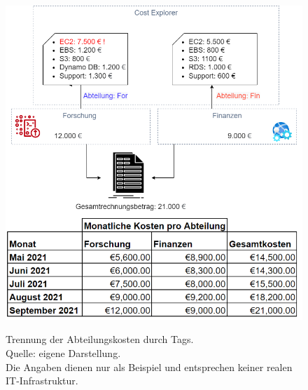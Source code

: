 \begin{figure}[h!]
  \centering
  \includegraphics[scale=0.5]{sources/BA Diagramme-Nach Abteilung.drawio}
  \caption[Trennung der Kosten durch Tags]{}
  \label{fig:BA Diagramme-Nach Abteilung.drawio} 
  Trennung der Abteilungskosten durch Tags.\\%
  Quelle: eigene Darstellung.\\
  Die Angaben dienen nur als Beispiel und entsprechen keiner realen IT-Infrastruktur.
\end{figure}
